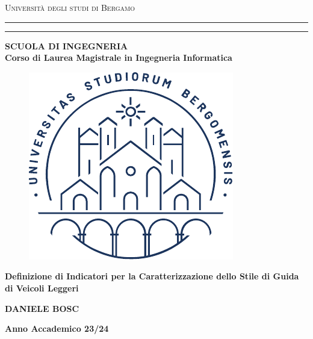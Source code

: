 \thispagestyle{empty}
\begin{titlepage}
\begin{center}
{{\Large{\textsc{Universit\`a degli studi di Bergamo}}}} \rule[0.1cm]{15.8cm}{0.1mm}
\rule[0.5cm]{15.8cm}{0.6mm}
{\small{\bf SCUOLA DI INGEGNERIA\\
Corso di Laurea Magistrale in Ingegneria Informatica}}
\end{center}

\vspace{8mm}
\begin{figure}[h]
    \centering
    \includegraphics{unibg_logo.pdf}
\end{figure}
\vspace{8mm}

\begin{center}
{\LARGE{\bf Definizione di Indicatori per la Caratterizzazione dello Stile di Guida di Veicoli Leggeri\\}}
\vspace{5mm}
\end{center}
\vspace{45mm}
\par
\noindent

\begin{center}
	{{\bf DANIELE BOSC}}
\end{center}
\vspace{15mm}
\begin{center}
{{\bf Anno Accademico 23/24}}
\end{center}    
\end{titlepage}